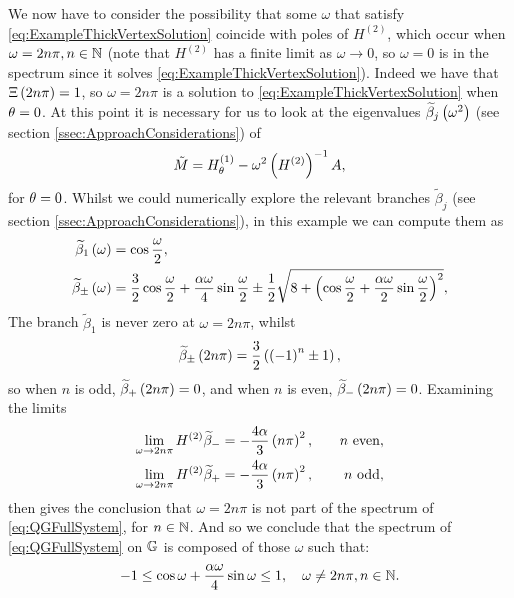 We now have to consider the possibility that some $\omega$ that satisfy \eqref{eq:ExampleThickVertexSolution} coincide with poles of $H^{(2)}$, which occur when $\omega = 2n\pi, n\in\mathbb{N}$ (note that $H^{(2)}$ has a finite limit as $\omega\rightarrow0$, so $\omega=0$ is in the spectrum since it solves \eqref{eq:ExampleThickVertexSolution}).
Indeed we have that $\Xi\left( 2n\pi \right)=1$, so $\omega=2n\pi$ is a solution to \eqref{eq:ExampleThickVertexSolution} when $\theta=0$.
At this point it is necessary for us to look at the eigenvalues $\widetilde{\beta}_j\left( \omega^2 \right)$ (see section \ref{ssec:ApproachConsiderations}) of 
\begin{align*}
	\tilde{M} = H^{(1)}_{\theta} - \omega^2 \left( H^{(2)} \right)^{-1}A,
\end{align*}
for $\theta=0$.
Whilst we could numerically explore the relevant branches $\widetilde{\beta}_{j}$ (see section \ref{ssec:ApproachConsiderations}), in this example we can compute them as
\begin{align*}
	\widetilde{\beta}_1\left( \omega \right) &= \cos\frac{\omega}{2}, \\
	\widetilde{\beta}_{\pm}\left( \omega \right) &= \frac{3}{2}\cos\frac{\omega}{2} + \frac{\alpha\omega}{4}\sin\frac{\omega}{2} \pm \frac{1}{2}\sqrt{ 8 + \left(  \cos\frac{\omega}{2} + \frac{\alpha\omega}{2}\sin\frac{\omega}{2}  \right)^2 },
\end{align*}
The branch $\widetilde{\beta}_1$ is never zero at $\omega=2n\pi$, whilst 
\begin{align*}
	\widetilde{\beta}_{\pm}\left( 2n\pi \right) = \frac{3}{2}\left(  \left( -1 \right)^n \pm 1 \right),
\end{align*}
so when $n$ is odd, $\widetilde{\beta}_{+}\left( 2n\pi \right) = 0$, and when $n$ is even, $\widetilde{\beta}_{-}\left( 2n\pi \right) = 0$.
Examining the limits
\begin{align*}
	\lim_{\omega\rightarrow2n\pi} H^{(2)}\widetilde{\beta}_{-} &= -\frac{4\alpha}{3}\left( n\pi \right)^2, &\quad n \ \text{even}, \\
	\lim_{\omega\rightarrow2n\pi} H^{(2)}\widetilde{\beta}_{+} &= -\frac{4\alpha}{3}\left( n\pi \right)^2, &\quad n \ \text{odd},
\end{align*}
then gives the conclusion that $\omega=2n\pi$ is not part of the spectrum of \eqref{eq:QGFullSystem}, for $n\in\mathbb{N}$.
And so we conclude that the spectrum of \eqref{eq:QGFullSystem} on $\mathbb{G}$ is composed of those $\omega$ such that:
\begin{align} \label{eq:CrossInPlane_ScalarDR}
	-1 \leq \cos\omega + \frac{\alpha\omega}{4}\sin\omega \leq 1, \quad \omega\neq 2n\pi, n\in\mathbb{N}.
\end{align}

